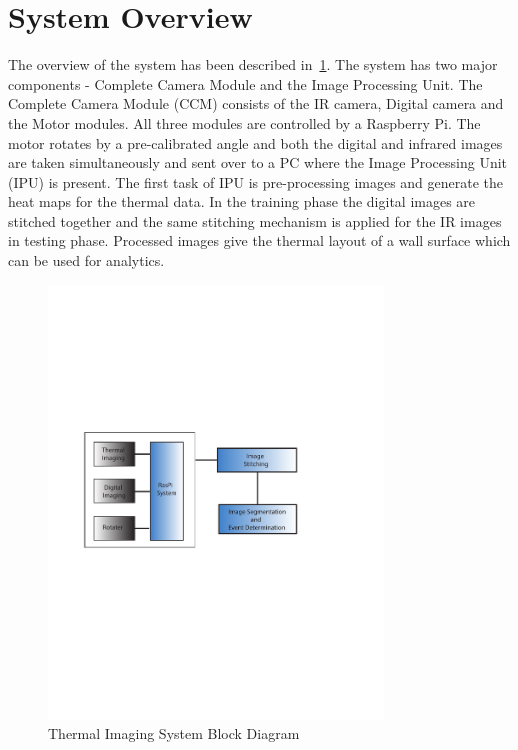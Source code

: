 \section{System Overview}

\indent The overview of the system has been described in~\ref{fig:Overview}. The system has two major components - Complete Camera Module and the Image Processing Unit. The Complete Camera Module (CCM) consists of the IR camera, Digital camera and the Motor modules. All three modules are controlled by a Raspberry Pi. The motor rotates by a pre-calibrated angle and both the digital and infrared images are taken simultaneously and sent over to a PC where the Image Processing Unit (IPU) is present. The first task of IPU is pre-processing images and generate the heat maps for the thermal data. In the training phase the digital images are stitched together and the same stitching mechanism is applied for the IR images in testing phase. Processed images give the thermal layout of a wall surface which can be used for analytics.

\begin{figure}[t!]
\begin{center}
	\includegraphics[width=3.5in]{figs/SystemArch.pdf}
\end{center}
  \caption{Thermal Imaging System Block Diagram}
  \label{fig:Overview}
\end{figure}
